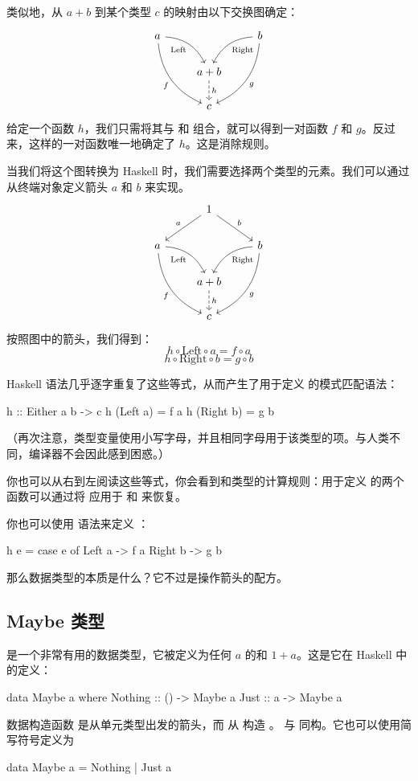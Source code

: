 \documentclass[DaoFP]{subfiles}
\begin{document}
类似地，从 $a + b$ 到某个类型 $c$ 的映射由以下交换图确定：
\[
 \begin{tikzcd}
 a
 \arrow[dr,  bend left, "\text{Left}"']
 \arrow[ddr, bend right, "f"']
 && b
 \arrow[dl, bend right, "\text{Right}"]
 \arrow[ddl, bend left, "g"]
 \\
&a + b
\arrow[d, dashed, "h"]
\\
& c
 \end{tikzcd}
\]
给定一个函数 $h$，我们只需将其与  和  组合，就可以得到一对函数 $f$ 和 $g$。反过来，这样的一对函数唯一地确定了 $h$。这是消除规则。

当我们将这个图转换为 Haskell 时，我们需要选择两个类型的元素。我们可以通过从终端对象定义箭头 $a$ 和 $b$ 来实现。
\[
 \begin{tikzcd}
 &1
 \arrow[ld, "a"']
 \arrow[rd, "b"]
 \\
 a
 \arrow[dr,  bend left, "\text{Left}"']
 \arrow[ddr, bend right, "f"']
 && b
 \arrow[dl, bend right, "\text{Right}"]
 \arrow[ddl, bend left, "g"]
 \\
&a + b
\arrow[d, dashed, "h"]
\\
& c
 \end{tikzcd}
\]
按照图中的箭头，我们得到：
\[h \circ \text{Left} \circ a = f \circ a\]
\[h \circ \text{Right} \circ b = g \circ b\]

Haskell 语法几乎逐字重复了这些等式，从而产生了用于定义  的模式匹配语法：

\begin{haskell}
h :: Either a b -> c
h (Left  a) = f a
h (Right b) = g b
\end{haskell}
（再次注意，类型变量使用小写字母，并且相同字母用于该类型的项。与人类不同，编译器不会因此感到困惑。）

你也可以从右到左阅读这些等式，你会看到和类型的计算规则：用于定义  的两个函数可以通过将  应用于  和  来恢复。

你也可以使用  语法来定义 ：
\begin{haskell}
h e = case e of
  Left  a -> f a
  Right b -> g b
\end{haskell}

那么数据类型的本质是什么？它不过是操作箭头的配方。

\subsection{Maybe 类型}

 是一个非常有用的数据类型，它被定义为任何 $a$ 的和 $1 + a$。这是它在 Haskell 中的定义：
\begin{haskell}
data Maybe a where
  Nothing :: () -> Maybe a
  Just    ::  a -> Maybe a
\end{haskell}
数据构造函数  是从单元类型出发的箭头，而  从  构造 。 与  同构。它也可以使用简写符号定义为
\begin{haskell}
data Maybe a = Nothing | Just a
\end{haskell}
\end{document}
